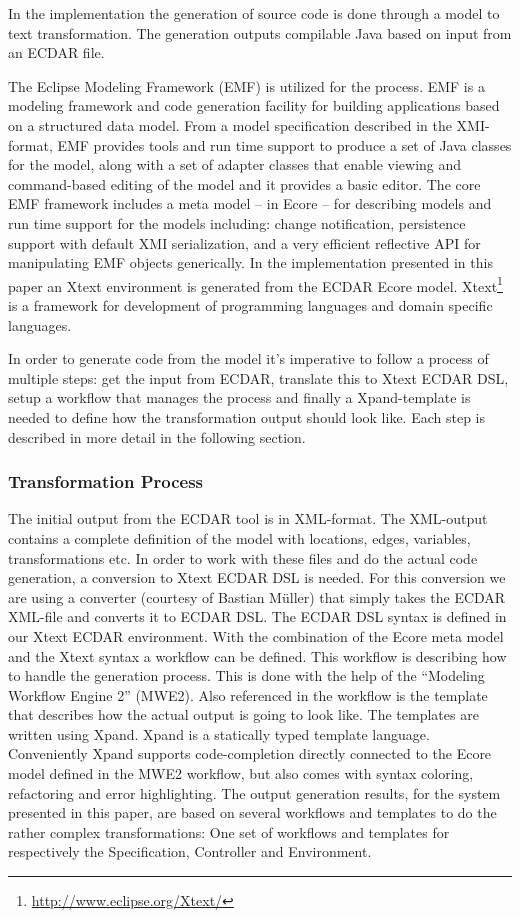 In the implementation the generation of source code is done
through a model to text transformation. The generation outputs compilable
Java based on input from an ECDAR file.

The Eclipse Modeling Framework (EMF) is utilized for the process. EMF is a
modeling framework and code generation facility for building applications based
on a structured data model. From a model specification described in the
XMI-format, EMF provides tools and run time support to produce a set of Java
classes for the model, along with a set of adapter classes that enable viewing
and command-based editing of the model and it provides a basic editor. The core
EMF framework includes a meta model -- in Ecore -- for describing models and run
time support for the models including: change notification, persistence support
with default XMI serialization, and a very efficient reflective API for
manipulating EMF objects generically. In the implementation presented in this
paper an Xtext environment is generated from the ECDAR Ecore
model. Xtext\footnote{\url{http://www.eclipse.org/Xtext/}} is a framework for
development of programming languages and domain specific languages.

In order to generate code from the model it's imperative to follow a process of
multiple steps: get the input from ECDAR, translate this to Xtext ECDAR DSL,
setup a workflow that manages the process and finally a Xpand-template is needed
to define how the transformation output should look like. Each step is described in more detail in the following section.

\subsubsection{Transformation Process}
\label{transformation-process}

The initial output from the ECDAR tool is in XML-format. The XML-output
contains a complete definition of the model with locations, edges, variables,
transformations etc. In order to work with these files and do the actual code
generation, a conversion to Xtext ECDAR DSL is needed. For this conversion we
are using a converter (courtesy of Bastian M\"uller) that simply takes the ECDAR XML-file and converts it to ECDAR DSL. The ECDAR DSL syntax is defined in our Xtext ECDAR
environment. With the combination of the Ecore meta model and the Xtext syntax a
workflow can be defined. This workflow is describing how to handle the
generation process. This is done with the help of the ``Modeling Workflow Engine 2''
(MWE2). Also referenced in the workflow is the template that describes how the
actual output is going to look like. The templates are written using
Xpand. Xpand is a statically typed template language. Conveniently Xpand
supports code-completion directly connected to the Ecore model defined in the
MWE2 workflow, but also comes with syntax coloring, refactoring and error
highlighting. The output generation results, for the system presented in this
paper, are based on several workflows and templates to do the rather complex
transformations: One set of workflows and templates for respectively the
Specification, Controller and Environment.

